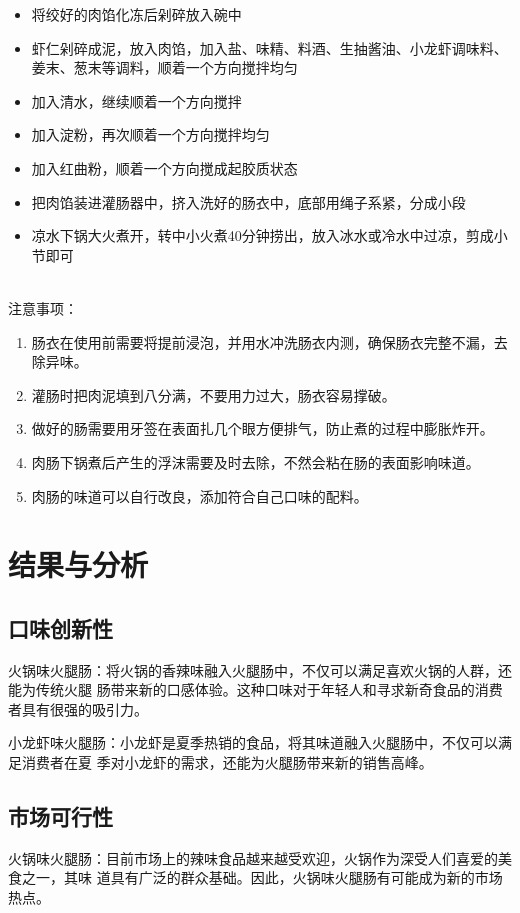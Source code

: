 \documentclass[UTF8]{ctexart}
\begin{document}
	\begin{itemize}
		\item 将绞好的肉馅化冻后剁碎放入碗中
		\item 虾仁剁碎成泥，放入肉馅，加入盐、味精、料酒、生抽酱油、小龙虾调味料、姜末、葱末等调料，顺着一个方向搅拌均匀
		\item 加入清水，继续顺着一个方向搅拌
		\item 加入淀粉，再次顺着一个方向搅拌均匀
		\item 加入红曲粉，顺着一个方向搅成起胶质状态
		\item 把肉馅装进灌肠器中，挤入洗好的肠衣中，底部用绳子系紧，分成小段
		\item 凉水下锅大火煮开，转中小火煮40分钟捞出，放入冰水或冷水中过凉，剪成小节即可
	\end{itemize}
	\quad\\
	注意事项：
	\begin{enumerate}
		\item 肠衣在使用前需要将提前浸泡，并用水冲洗肠衣内测，确保肠衣完整不漏，去除异味。
		\item 灌肠时把肉泥填到八分满，不要用力过大，肠衣容易撑破。
		\item 做好的肠需要用牙签在表面扎几个眼方便排气，防止煮的过程中膨胀炸开。
		\item 肉肠下锅煮后产生的浮沫需要及时去除，不然会粘在肠的表面影响味道。
		\item 肉肠的味道可以自行改良，添加符合自己口味的配料。
	\end{enumerate}

	\section{结果与分析}
	\subsection{口味创新性}
	火锅味火腿肠：将火锅的香辣味融入火腿肠中，不仅可以满足喜欢火锅的人群，还能为传统火腿
	肠带来新的口感体验。这种口味对于年轻人和寻求新奇食品的消费者具有很强的吸引力。

	小龙虾味火腿肠：小龙虾是夏季热销的食品，将其味道融入火腿肠中，不仅可以满足消费者在夏
	季对小龙虾的需求，还能为火腿肠带来新的销售高峰。

	\subsection{市场可行性}
	火锅味火腿肠：目前市场上的辣味食品越来越受欢迎，火锅作为深受人们喜爱的美食之一，其味
	道具有广泛的群众基础。因此，火锅味火腿肠有可能成为新的市场热点。
\end{document}
